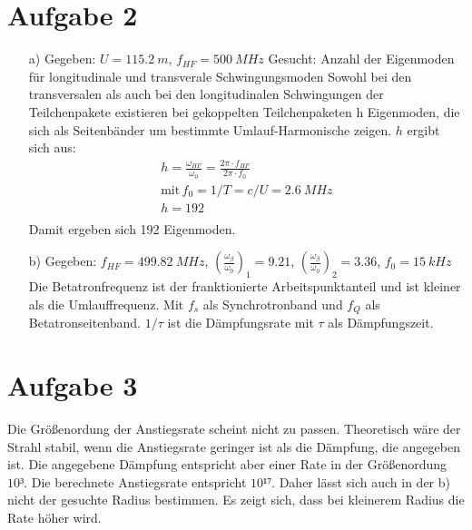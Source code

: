 \documentclass[11pt,a4paper]{article}
\begin{document}
	
    \section*{Aufgabe 2}
	\begin{itemize}
		\item[a)] 
			Gegeben: $U = \SI{115.2}{m}$, $f_{HF} = \SI{500}{MHz}$ \newline
			Gesucht: Anzahl der Eigenmoden für longitudinale und transverale Schwingungsmoden \newline
			Sowohl bei den transversalen als auch bei den longitudinalen Schwingungen der Teilchenpakete existieren bei gekoppelten Teilchenpaketen h Eigenmoden, 
			die sich als Seitenbänder um bestimmte Umlauf-Harmonische zeigen. $h$ ergibt sich aus:
			\begin{align*}
				h = \frac{\omega_{HF}}{\omega_0} = \frac{2\pi \cdot f_{HF}}{2\pi \cdot f_{0}} \\
				\text{mit} \, f_0 = 1/T = c/U = \SI{2.6}{MHz}\\
				h = 192 \\
			\end{align*}
			Damit ergeben sich 192 Eigenmoden.
		\item[b)]
			Gegeben: $f_{HF} = \SI{499.82}{MHz}$, $(\frac{\omega_{\beta}}{\omega_0})_{1} = 9.21$, \newline
			$(\frac{\omega_{\beta}}{\omega_0})_{2} = 3.36$, $f_{0} = \SI{15}{kHz}$  \newline
			Die Betatronfrequenz ist der franktionierte Arbeitspunktanteil und ist kleiner als die Umlauffrequenz.
			Mit $f_s$ als Synchrotronband und $f_Q$ als Betatronseitenband.
			$1/\tau$ ist die Dämpfungsrate mit $\tau$ als Dämpfungszeit.
 	\end{itemize}

	\section*{Aufgabe 3}

		Die Größenordung der Anstiegsrate scheint nicht zu passen. Theoretisch wäre der Strahl stabil, 
		wenn die Anstiegsrate geringer ist als die Dämpfung, die angegeben ist.
		Die angegebene Dämpfung entspricht aber einer Rate in der Größenordung $10³$.
		Die berechnete Anstiegsrate entspricht $10¹⁷$.
		Daher lässt sich auch in der b) nicht der gesuchte Radius bestimmen.
		Es zeigt sich, dass bei kleinerem Radius die Rate höher wird.
\end{document}
